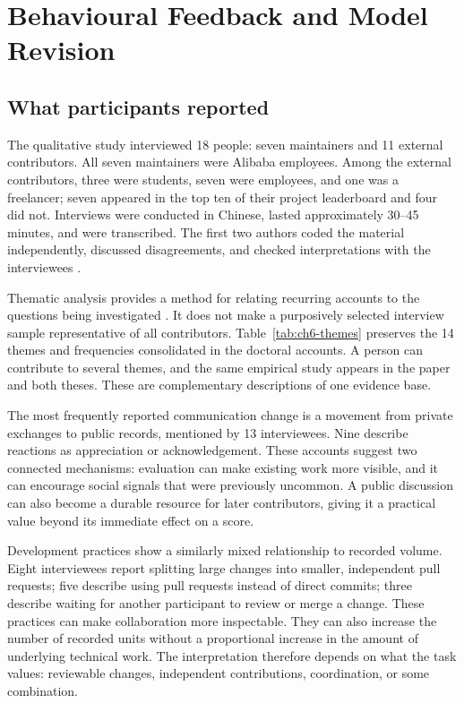 \section{Behavioural Feedback and Model Revision}
\label{sec:ch6-feedback}

\subsection{What participants reported}
The qualitative study interviewed 18 people: seven maintainers and 11 external contributors. All seven maintainers were Alibaba employees. Among the external contributors, three were students, seven were employees, and one was a freelancer; seven appeared in the top ten of their project leaderboard and four did not. Interviews were conducted in Chinese, lasted approximately 30--45 minutes, and were transcribed. The first two authors coded the material independently, discussed disagreements, and checked interpretations with the interviewees \citep[Section 4.2]{zhao2024}.

Thematic analysis provides a method for relating recurring accounts to the questions being investigated \citep{braun2006}. It does not make a purposively selected interview sample representative of all contributors. Table~\ref{tab:ch6-themes} preserves the 14 themes and frequencies consolidated in the doctoral accounts. A person can contribute to several themes, and the same empirical study appears in the paper and both theses. These are complementary descriptions of one evidence base.



The most frequently reported communication change is a movement from private exchanges to public records, mentioned by 13 interviewees. Nine describe reactions as appreciation or acknowledgement. These accounts suggest two connected mechanisms: evaluation can make existing work more visible, and it can encourage social signals that were previously uncommon. A public discussion can also become a durable resource for later contributors, giving it a practical value beyond its immediate effect on a score.

Development practices show a similarly mixed relationship to recorded volume. Eight interviewees report splitting large changes into smaller, independent pull requests; five describe using pull requests instead of direct commits; three describe waiting for another participant to review or merge a change. These practices can make collaboration more inspectable. They can also increase the number of recorded units without a proportional increase in the amount of underlying technical work. The interpretation therefore depends on what the task values: reviewable changes, independent contributions, coordination, or some combination.

